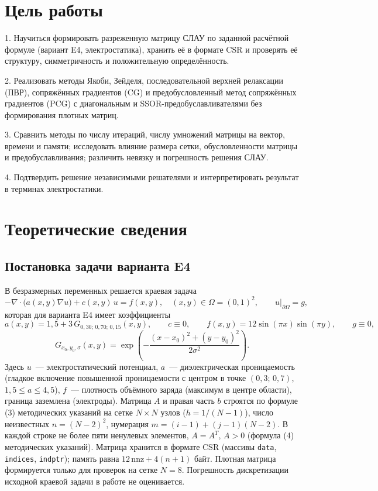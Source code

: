 \documentclass[12pt]{article}
\begin{document}
\newpage

\thispagestyle{empty}
\renewcommand{\contentsname}{ОГЛАВЛЕНИЕ}
\tableofcontents

\newpage

\section{Цель работы}

1. Научиться формировать разреженную матрицу СЛАУ по заданной расчётной формуле (вариант E4, электростатика), хранить её в формате CSR и проверять её структуру, симметричность и положительную определённость.\par

2. Реализовать методы Якоби, Зейделя, последовательной верхней релаксации (ПВР), сопряжённых градиентов (CG) и предобусловленный метод сопряжённых градиентов (PCG) с диагональным и SSOR-предобуславливателями без формирования плотных матриц.\par

3. Сравнить методы по числу итераций, числу умножений матрицы на вектор, времени и памяти; исследовать влияние размера сетки, обусловленности матрицы и предобуславливания; различить невязку и погрешность решения СЛАУ.\par

4. Подтвердить решение независимыми решателями и интерпретировать результат в терминах электростатики.\par

\section{Теоретические сведения}

\subsection{Постановка задачи варианта E4}

В безразмерных переменных решается краевая задача
\[
-\nabla\cdot\bigl(a(x,y)\nabla u\bigr)+c(x,y)\,u=f(x,y),\quad (x,y)\in\Omega=(0,1)^2,\qquad u\big|_{\partial\Omega}=g,
\]
которая для варианта E4 имеет коэффициенты
\[
a(x,y)=1{,}5+3\,G_{0{,}30;\,0{,}70;\,0{,}15}(x,y),\qquad c\equiv0,\qquad f(x,y)=12\sin(\pi x)\sin(\pi y),\qquad g\equiv0,
\]
\[
G_{x_0,y_0,\sigma}(x,y)=\exp\left(-\frac{(x-x_0)^2+(y-y_0)^2}{2\sigma^2}\right).
\]
Здесь $u$~--- электростатический потенциал, $a$~--- диэлектрическая проницаемость (гладкое включение повышенной проницаемости с центром в точке $(0{,}3;\,0{,}7)$, $1{,}5\le a\le4{,}5$), $f$~--- плотность объёмного заряда (максимум в центре области), граница заземлена (электроды). Матрица $A$ и правая часть $b$ строятся по формуле (3) методических указаний на сетке $N\times N$ узлов ($h=1/(N-1)$), число неизвестных $n=(N-2)^2$, нумерация $m=(i-1)+(j-1)(N-2)$. В каждой строке не более пяти ненулевых элементов, $A=A^T$, $A>0$ (формула (4) методических указаний). Матрица хранится в формате CSR (массивы \texttt{data}, \texttt{indices}, \texttt{indptr}); память равна $12\,\mathrm{nnz}+4(n+1)$ байт. Плотная матрица формируется только для проверок на сетке $N=8$. Погрешность дискретизации исходной краевой задачи в работе не оценивается.
\end{document}
